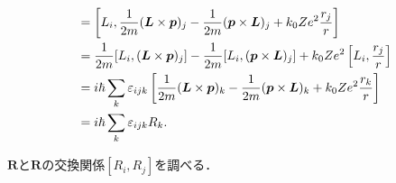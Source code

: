 \begin{align}
  [L_i,R_j] & = \left[L_i,\frac{1}{2m}(\boldsymbol{L}\times\boldsymbol{p})_j - \frac{1}{2m}(\boldsymbol{p}\times\boldsymbol{L})_j + k_0Ze^2\frac{r_j}{r}\right]\notag\\
  & = \frac{1}{2m}[L_i,(\boldsymbol{L}\times\boldsymbol{p})_j] - \frac{1}{2m}[L_i,(\boldsymbol{p}\times\boldsymbol{L})_j] + k_0Ze^2\left[L_i,\frac{r_j}{r}\right]\notag\\
  & = i\hbar\sum_k\varepsilon_{ijk}\left[\frac{1}{2m}(\boldsymbol{L}\times\boldsymbol{p})_k - \frac{1}{2m}(\boldsymbol{p}\times\boldsymbol{L})_k + k_0Ze^2\frac{r_k}{r}\right]\notag\\
  & = i\hbar\sum_k\varepsilon_{ijk}R_k.
\end{align}

$\boldsymbol{R}$と$\boldsymbol{R}$の交換関係$[R_i,R_j]$を調べる．
